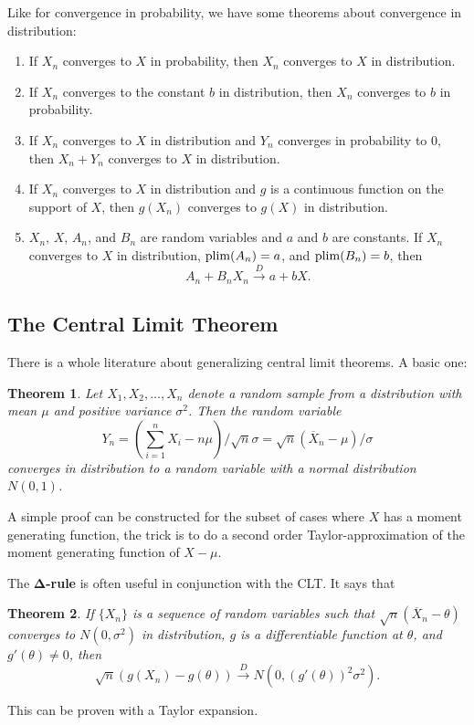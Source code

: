 \documentclass[twoside]{article}
\newtheorem{theorem}{Theorem}%
\begin{document}
Like for convergence in probability, we have some theorems about convergence in distribution:

\begin{enumerate}
\item If $X_n$ converges to $X$ in probability, then $X_n$ converges to $X$ in distribution.
\item If $X_n$ converges to the constant $b$ in distribution, then $X_n$
converges to $b$ in probability.
\item If $X_n$ converges to $X$ in distribution and $Y_n$ converges in probability to $0$,
then $X_n+Y_n$ converges to $X$ in distribution.
\item If $X_n$ converges to $X$ in distribution and $g$ is a continuous function on the support
of $X$, then $g(X_n)$ converges to $g(X)$ in distribution.
\item $X_n$, $X$, $A_n$, and $B_n$ are random variables and $a$ and $b$ are constants. 
If $X_n$ converges to $X$ in distribution, $\operatorname{plim}(A_n)=a$, and $\operatorname{plim}(B_n)=b$, then
\[ A_n + B_n X_n \xrightarrow{D} a + bX.\]
\end{enumerate}


\subsection{The Central Limit Theorem}
There is a whole literature about generalizing central limit theorems. A basic one:

\begin{theorem}
Let $X_1,X_2,\dots,X_n$ denote a random sample from a distribution with mean
$\mu$ and positive variance $\sigma^2$. Then the random variable \[ Y_n =
\left(\sum_{i=1}^n X_i - n\mu \right)/\sqrt{n}\sigma =
\sqrt{n}(\overline{X}_n-\mu)/\sigma\] converges in distribution to a random
variable with a normal distribution $N(0,1)$. 
\end{theorem}

A simple proof can be constructed for the subset of cases where $X$ has a moment generating
function, the trick is to do a second order Taylor-approximation of the moment generating
function of $X-\mu$. 

The $\mathbf{\Delta}$\textbf{-rule} is often useful in conjunction with the CLT.
It says that 

\begin{theorem}
If $\{X_n\}$ is a sequence of random variables such that $\sqrt{n}(\overline{X}_n-\theta)$
converges to $N(0,\sigma^2)$ in distribution, $g$ is a differentiable function at $\theta$,
and $g'(\theta)\neq 0$, then 
\[ \sqrt{n}\left(g(X_n) - g(\theta)\right) \xrightarrow{D} 
N\left(0, \left(g'(\theta)\right)^2\sigma^2\right).\]
\end{theorem}
This can be proven with a Taylor expansion. 
\end{document}
